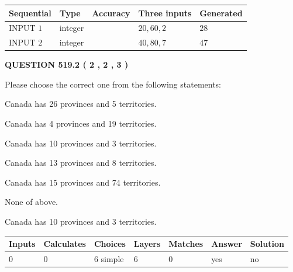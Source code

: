 \documentclass[12pt]{article}
\begin{document}
  
\noindent\begin{tabular}{|l|l|l|l|l|}
\hline
 Sequential & Type & Accuracy & Three inputs & Generated \\ 
\hline
 
 
  INPUT $  1 $ & integer &  & $
 20
 , 
 60
 , 
 2
 $ & $ 28 $ 
 \\  \hline  
 
 
  INPUT $  2 $ & integer &  & $
 40
 , 
 80
 , 
 7
 $ & $ 47 $ 
 \\  \hline  
 \end{tabular}
   
   
  
\vspace{0.2in}
  
{\textbf{\Large{QUESTION
519.2 
 ( 2 , 2 , 3 )
}}}
  
  
Please choose the correct one from the following statements:
 
 
Canada has  26 provinces and  5 territories.
 
 
Canada has   4 provinces and  19 territories.
 
 
Canada has 10  provinces and 3 territories.
 
 
Canada has  13 provinces and  8 territories.
 
 
Canada has  15 provinces and  74 territories.
 
 
 None of above.
 
 
\noindent{}
 
 
Canada has 10  provinces and 3 territories.
 
 
\noindent{}
 
 
   
   
   
   
\noindent\begin{tabular}{|l|l|l|l|l|l|l|}
 \hline
Inputs & Calculates & Choices & Layers & Matches & Answer & Solution \\ \hline
 0  & 
 0  & 
 6
  simple  
  & 
 6  & 
 0  & 
  yes & 
  no 
  \\ \hline
 \end{tabular}
   
\end{document}

